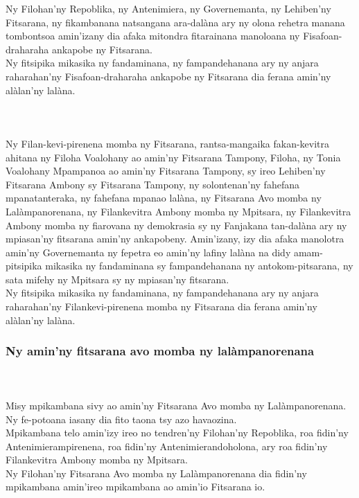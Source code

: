 \documentclass[12pt]{article}
\newcounter{laharana}
\newcommand{\andininy}[0]{
  \paragraph{%
    \NoCaseChange{%
      Andininy~\addtocounter{laharana}{1}\thelaharana.}\label{and:\thelaharana}~%
  }%
}
\begin{document}
\noindent
Ny Filohan'ny Repoblika, ny Antenimiera, ny Governemanta, ny Lehiben'ny
Fitsarana, ny fikambanana natsangana ara-dalàna ary ny olona rehetra manana
tombontsoa amin'izany dia afaka mitondra fitarainana manoloana ny
Fisafoan-draharaha ankapobe ny Fitsarana.\\

\noindent
Ny fitsipika mikasika ny fandaminana, ny fampandehanana ary ny anjara
raharahan'ny Fisafoan-draharaha ankapobe ny Fitsarana dia ferana amin'ny
alàlan'ny lalàna.

\andininy{}Ny Filan-kevi-pirenena momba ny Fitsarana, rantsa-mangaika
fakan-kevitra ahitana ny Filoha Voalohany ao amin'ny Fitsarana Tampony, Filoha,
ny Tonia Voalohany Mpampanoa ao amin'ny Fitsarana Tampony, sy ireo Lehiben'ny
Fitsarana Ambony sy Fitsarana Tampony, ny solontenan'ny fahefana mpanatanteraka,
ny fahefana mpanao lalàna, ny Fitsarana Avo momba ny Lalàmpanorenana, ny
Filankevitra Ambony momba ny Mpitsara, ny Filankevitra Ambony momba ny fiarovana
ny demokrasia sy ny Fanjakana tan-dalàna ary ny mpiasan'ny fitsarana amin'ny
ankapobeny. Amin'izany, izy dia afaka manolotra amin'ny Governemanta ny fepetra
eo amin'ny lafiny lalàna na didy amam-pitsipika mikasika ny fandaminana sy
fampandehanana ny antokom-pitsarana, ny sata mifehy ny Mpitsara sy ny mpiasan'ny
fitsarana.\\

\noindent
Ny fitsipika mikasika ny fandaminana, ny fampandehanana ary ny anjara
raharahan'ny Filankevi-pirenena momba ny Fitsarana dia ferana amin'ny alàlan'ny
lalàna.

\subsubsection{Ny amin'ny fitsarana avo momba ny lalàmpanorenana}
\label{sec:ny-aminny-fitsarana-1}

\andininy{}Misy mpikambana sivy ao amin'ny Fitsarana Avo momba ny
Lalàmpanorenana. Ny fe-potoana iasany dia fito taona tsy azo havaozina.\\

\noindent
Mpikambana telo amin'izy ireo no tendren'ny Filohan'ny Repoblika, roa fidin'ny
Antenimierampirenena, roa fidin'ny Antenimierandoholona, ary roa fidin'ny
Filankevitra Ambony momba ny Mpitsara.\\

\noindent
Ny Filohan'ny Fitsarana Avo momba ny Lalàmpanorenana dia fidin'ny mpikambana
amin'ireo mpikambana ao amin'io Fitsarana io.\\
\end{document}
